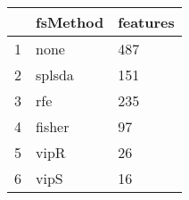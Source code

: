 \begin{table}[ht]
\centering
\begin{tabular}{rll}
  \hline
 & fsMethod & features \\ 
  \hline
1 & none & 487 \\ 
  2 & splsda & 151 \\ 
  3 & rfe & 235 \\ 
  4 & fisher & 97 \\ 
  5 & vipR & 26 \\ 
  6 & vipS & 16 \\ 
   \hline
\end{tabular}
\end{table}
